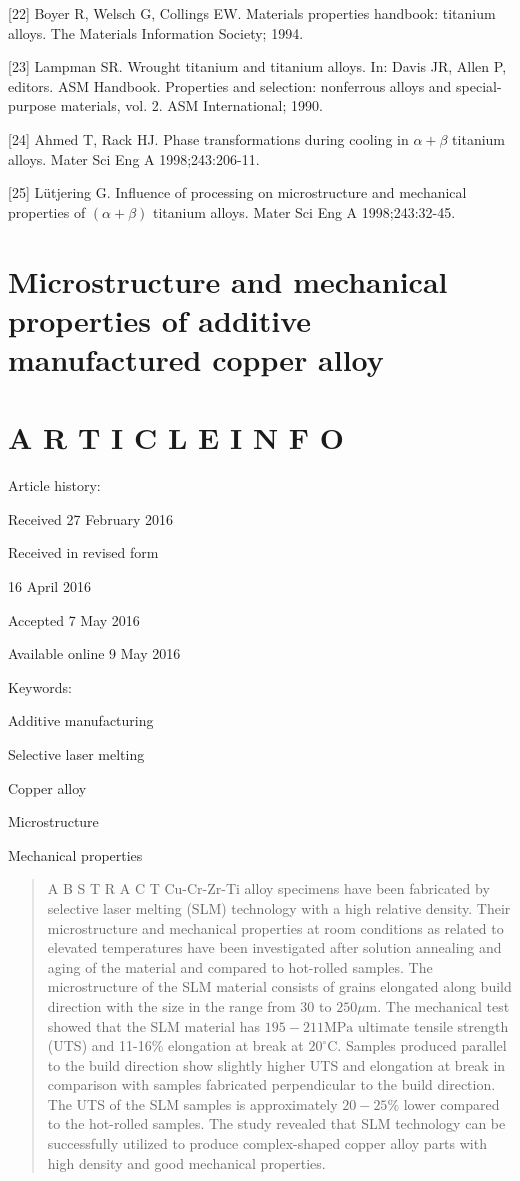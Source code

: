 \documentclass[10pt]{article}
\begin{document}
[22] Boyer R, Welsch G, Collings EW. Materials properties handbook: titanium alloys. The Materials Information Society; 1994.

[23] Lampman SR. Wrought titanium and titanium alloys. In: Davis JR, Allen P, editors. ASM Handbook. Properties and selection: nonferrous alloys and special-purpose materials, vol. 2. ASM International; 1990.

[24] Ahmed T, Rack HJ. Phase transformations during cooling in $\alpha+\beta$ titanium alloys. Mater Sci Eng A 1998;243:206-11.

[25] Lütjering G. Influence of processing on microstructure and mechanical properties of $(\alpha+\beta)$ titanium alloys. Mater Sci Eng A 1998;243:32-45.

\section*{Microstructure and mechanical properties of additive manufactured copper alloy }


\section*{A R T I C L E I N F O}
Article history:

Received 27 February 2016

Received in revised form

16 April 2016

Accepted 7 May 2016

Available online 9 May 2016

Keywords:

Additive manufacturing

Selective laser melting

Copper alloy

Microstructure

Mechanical properties

\begin{abstract}
A B S T R A C T Cu-Cr-Zr-Ti alloy specimens have been fabricated by selective laser melting (SLM) technology with a high relative density. Their microstructure and mechanical properties at room conditions as related to elevated temperatures have been investigated after solution annealing and aging of the material and compared to hot-rolled samples. The microstructure of the SLM material consists of grains elongated along build direction with the size in the range from 30 to $250 \mu \mathrm{m}$. The mechanical test showed that the SLM material has $195-211 \mathrm{MPa}$ ultimate tensile strength (UTS) and 11-16\% elongation at break at $20^{\circ} \mathrm{C}$. Samples produced parallel to the build direction show slightly higher UTS and elongation at break in comparison with samples fabricated perpendicular to the build direction. The UTS of the SLM samples is approximately $20-25 \%$ lower compared to the hot-rolled samples. The study revealed that SLM technology can be successfully utilized to produce complex-shaped copper alloy parts with high density and good mechanical properties.
\end{abstract}
\end{document}
